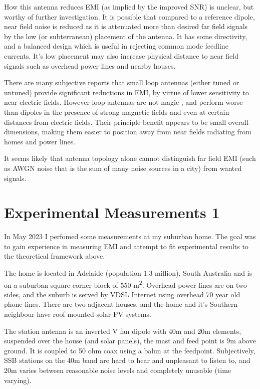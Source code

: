 \documentclass{article}
\begin{document}
How this antenna reduces EMI (as implied by the improved SNR) is unclear, but worthy of further investigation. It is possible that compared to a reference dipole, near field noise is reduced as it is attenuated more than desired far field signals by the low (or subterranean) placement of the antenna.  It has some directivity, and a balanced design which is useful in rejecting common mode feedline currents.  It's low placement may also increase physical distance to near field signals such as overhead power lines and nearby houses. 

There are many subjective reports that small loop antennas (either tuned or untuned) provide significant reductions in EMI, by virtue of lower sensitivity to near electric fields.  However loop antennas are not magic \cite{w8ji_radio_noise}, and perform worse than dipoles in the presence of strong magnetic fields and even at certain distances from electric fields.  Their principle benefit appears to be small overall dimensions, making them easier to position away from near fields radiating from homes and power lines.

It seems likely that antenna topology alone cannot distinguish far field EMI (such as AWGN noise that is the sum of many noise sources in a city) from wanted signals.

\section{Experimental Measurements 1}

In May 2023 I perfomed some measurements at my suburban home.  The goal was to gain experience in measuring EMI and attempt to fit experimental results to the theoretical framework above.

The home is located in Adelaide (population 1.3 million), South Australia and is on a suburban square corner block of 550 \si{\metre\squared}.  Overhead power lines are on two sides, and the suburb is served by VDSL Internet using overhead 70 year old phone lines.  There are two adjacent houses, and the home and it's Southern neighbour have roof mounted solar PV systems.

The station antenna is an inverted V fan dipole with 40m and 20m elements, suspended over the house (and solar panels), the mast and feed point is 9m above ground. It is coupled to 50 ohm coax using a balun at the feedpoint. Subjectively, SSB stations on the 40m band are hard to hear and unpleasant to listen to, and 20m varies between reasonable noise levels and completely unusable (time varying).
\end{document}
